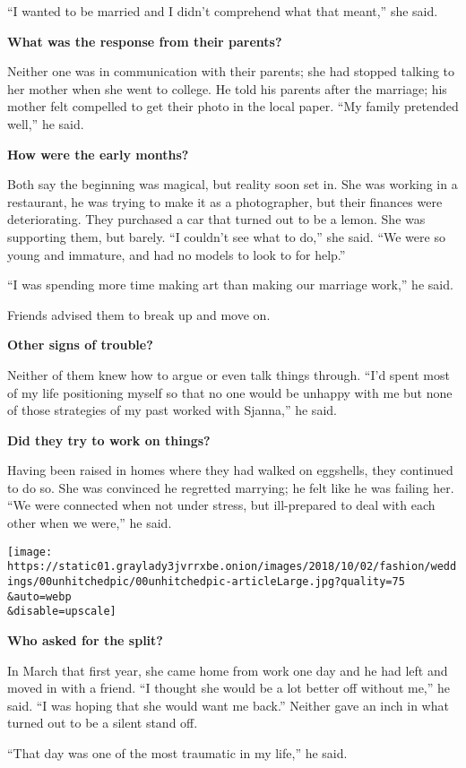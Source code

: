 ``I wanted to be married and I didn't comprehend what that meant,'' she
said.

\textbf{What was the response from their parents?}

Neither one was in communication with their parents; she had stopped
talking to her mother when she went to college. He told his parents
after the marriage; his mother felt compelled to get their photo in the
local paper. ``My family pretended well,'' he said.

\textbf{How were the early months?}

Both say the beginning was magical, but reality soon set in. She was
working in a restaurant, he was trying to make it as a photographer, but
their finances were deteriorating. They purchased a car that turned out
to be a lemon. She was supporting them, but barely. ``I couldn't see
what to do,'' she said. ``We were so young and immature, and had no
models to look to for help.''

``I was spending more time making art than making our marriage work,''
he said.

Friends advised them to break up and move on.

\textbf{Other signs of trouble?}

Neither of them knew how to argue or even talk things through. ``I'd
spent most of my life positioning myself so that no one would be unhappy
with me but none of those strategies of my past worked with Sjanna,'' he
said.

\textbf{Did they try to work on things?}

Having been raised in homes where they had walked on eggshells, they
continued to do so. She was convinced he regretted marrying; he felt
like he was failing her. ``We were connected when not under stress, but
ill-prepared to deal with each other when we were,'' he said.

\texttt{[image: https://static01.graylady3jvrrxbe.onion/images/2018/10/02/fashion/weddings/00unhitchedpic/00unhitchedpic-articleLarge.jpg?quality=75\\\&auto=webp\\\&disable=upscale]}

\textbf{Who asked for the split?}

In March that first year, she came home from work one day and he had
left and moved in with a friend. ``I thought she would be a lot better
off without me,'' he said. ``I was hoping that she would want me back.''
Neither gave an inch in what turned out to be a silent stand off.

``That day was one of the most traumatic in my life,'' he said.

